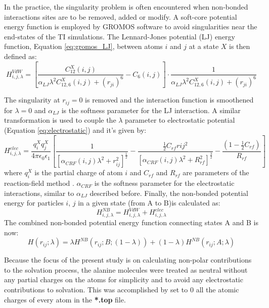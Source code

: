 In the practice, the singularity problem is often encountered when non-bonded interactions sites are to be removed, added or modify. A soft-core potential energy function is employed by GROMOS software to avoid singularities near the end-states of the TI simulations. The Lennard-Jones potential (LJ) energy function, Equation \ref{eq:gromos_LJ}, between atoms $i$ and $j$ at a state $X$ is then defined as:
\begin{equation}
    H^{VdW}_{i,j,\lambda} = \left [ \frac{C_{12}^{X}(i,j)}{\alpha_{LJ}\lambda^{2}C_{12,6}^{X}(i,j)+(r_{ji})^{6}} - C_{6}(i,j)\right ]\cdot \frac{1}{\alpha_{LJ}\lambda^{2}C_{12,6}^{X}(i,j)+(r_{ji})^{6}}
\end{equation}

The singularity at $r_{ij}=0$ is removed and the interaction function is smoothened for $\lambda=0$ and $\alpha_{LJ}$ is the softness parameter for the LJ interaction. A similar transformation is used to couple the $\lambda$ parameter to electrostatic potential (Equation \ref{eq:electrostatic}) and it's given by: 
\begin{equation}
    H^{elec}_{i,j,\lambda}=\frac{q^X_i q^X_j}{4\pi \epsilon_0 \epsilon_1}\left [ \frac{1}{\left [ \alpha_{CRF}(i,j)\lambda^2+r_{ij}^2\right ]^{\frac{1}{2}}} - \frac{\frac{1}{2}C_{rf}r{ij}^2}{\left [\alpha_{CRF}(i,j)\lambda^2+R_{rf}^2 \right ]^\frac{3}{2}} - \frac{\left ( 1-\frac{1}{2}C_{rf}\right )}{R_{rf}}\right ]
    \label{eq:softcorepot}
\end{equation}
where $q_i^X$ is the partial charge of atom $i$ and $C_{rf}$ and $R_{rf}$ are parameters of the reaction-field method \cite{tironi1995generalized}. $\alpha_{CRF}$ is the softness parameter for the electrostatic interactions, similar to $\alpha_{LJ}$ described before. Finally, the non-bonded potential energy for particles $i$, $j$ in a given state (from A to B)is calculated as:
\begin{equation}
    H_{i,j,\lambda}^{NB}= H^{VdW}_{i,j,\lambda}+H^{elec}_{i,j,\lambda}
\end{equation}
The combined non-bonded potential energy function connecting states A and B is now:
\begin{equation}
    H(r_{ij};\lambda)=\lambda H^{NB}(r_{ij};B;(1-\lambda))+(1-\lambda)H^{NB}(r_{ij};A;\lambda)
\end{equation}

Because the focus of the present study is on calculating non-polar contributions to the solvation process, the alanine molecules were treated as neutral without any partial charges on the atoms for simplicity and to avoid any electrostatic contributions to solvation. This was accomplished by set to 0 all the atomic charges of every atom in the \textbf{*.top} file. 